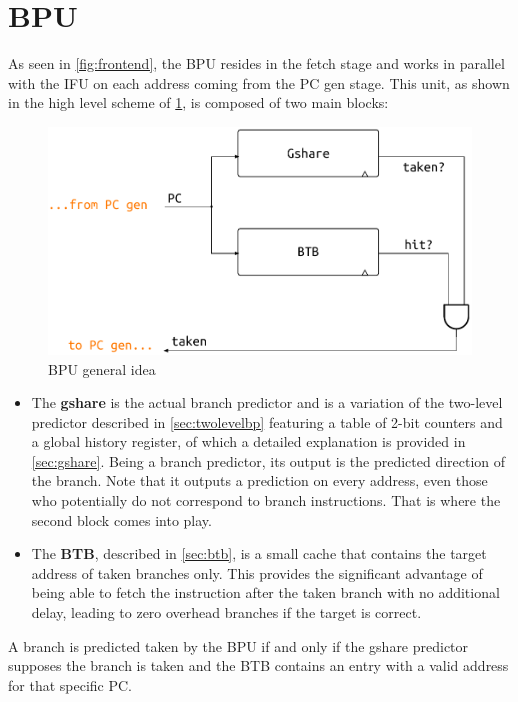 \section{\acf{BPU}}
As seen in \cref{fig:frontend}, the \ac{BPU} resides in the fetch stage and works in parallel with the \ac{IFU} on each address coming from the \ac{PC} gen stage. This unit, as shown in the high level scheme of \cref{fig:bpu-idea}, is composed of two main blocks:
\begin{figure}[hbt]
  \centering
  \includegraphics[width=.8\textwidth]{img/bpu-idea.pdf}
  \caption{\acs{BPU} general idea}
  \label{fig:bpu-idea}
\end{figure}
\begin{itemize}
  \item The \textbf{gshare} is the actual branch predictor and is a variation of the two-level predictor described in \cref{sec:twolevelbp} featuring a table of 2-bit counters and a global history register, of which a detailed explanation is provided in \cref{sec:gshare}. Being a branch predictor, its output is the predicted direction of the branch. Note that it outputs a prediction on every address, even those who potentially do not correspond to branch instructions. That is where the second block comes into play.
  \item The \textbf{\acf{BTB}}, described in \cref{sec:btb}, is a small cache that contains the target address of taken branches only. This provides the significant advantage of being able to fetch the instruction after the taken branch with no additional delay, leading to zero overhead branches if the target is correct.
\end{itemize}
A branch is predicted taken by the \ac{BPU} if and only if the gshare predictor supposes the branch is taken and the \ac{BTB} contains an entry with a valid address for that specific \ac{PC}.

